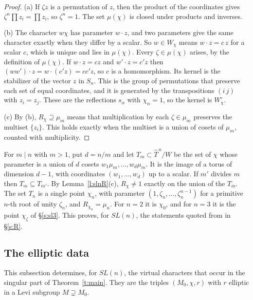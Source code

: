 \documentclass[12pt,letterpaper]{article}
\numberwithin{equation}{section}
\theoremstyle{plain}
\theoremstyle{definition}
\theoremstyle{remark}
\newcommand{\Thu}{\widehat{T}^{\,u}}
\begin{document}
\begin{proof}
(a) If $\zeta z$ is a permutation of $z$, then the product of the coordinates gives $\zeta^n\prod z_i=\prod z_i$, so $\zeta^n=1$. The set $\mu(\chi)$ is closed under products and inverses.

(b) The character $w\chi$ has parameter $w\cdot z$, and two parameters give the same character exactly when they differ by a scalar. So $w\in W_\chi$ means $w\cdot z=c\,z$ for a scalar $c$, which is unique and lies in $\mu(\chi)$. Every $\zeta\in\mu(\chi)$ arises, by the definition of $\mu(\chi)$. If $w\cdot z=cz$ and $w'\cdot z=c'z$ then $(ww')\cdot z=w\cdot(c'z)=cc'z$, so $c$ is a homomorphism. Its kernel is the stabilizer of the vector $z$ in $S_n$. This is the group of permutations that preserve each set of equal coordinates, and it is generated by the transpositions $(i\,j)$ with $z_i=z_j$. These are the reflections $s_\alpha$ with $\chi_\alpha=1$, so the kernel is $W^\circ_\chi$.

(c) By (b), $R_\chi\supseteq\mu_m$ means that multiplication by each $\zeta\in\mu_m$ preserves the multiset $\{z_i\}$. This holds exactly when the multiset is a union of cosets of $\mu_m$, counted with multiplicity.
\end{proof}

For $m\mid n$ with $m>1$, put $d=n/m$ and let $T_m\subset\Thu/W$ be the set of $\chi$ whose parameter is a union of $d$ cosets $w_1\mu_m,\dots,w_d\mu_m$. It is the image of a torus of dimension $d-1$, with coordinates $(w_1,\dots,w_d)$ up to a scalar. If $m'$ divides $m$ then $T_m\subseteq T_{m'}$. By Lemma~\ref{l:slnR}(c), $R_\chi\ne1$ exactly on the union of the $T_m$. The set $T_n$ is a single point $\chi_n$, with parameter $(1,\zeta_n,\dots,\zeta_n^{n-1})$ for a primitive $n$-th root of unity $\zeta_n$, and $R_{\chi_n}=\mu_n$. For $n=2$ it is $\chi_0$, and for $n=3$ it is the point $\chi_\zeta$ of \S\ref{s:sl3}. This proves, for $SL(n)$, the statements quoted from \cite{Ke82} in \S\ref{s:R}.

\subsection{The elliptic data}\label{s:slnell}

This subsection determines, for $SL(n)$, the virtual characters that occur in the singular part of Theorem~\ref{t:main}. They are the triples $(M_0,\chi,r)$ with $r$ elliptic in a Levi subgroup $M\supsetneq M_0$.
\end{document}
